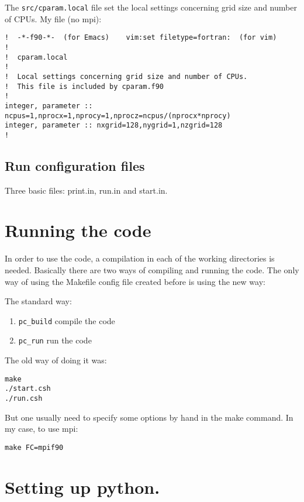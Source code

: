 \documentclass[a4paper,12pt]{article}
\begin{document}
The \texttt{src/cparam.local} file set the local settings concerning grid size
and number of CPUs. My file (no mpi):
\begin{verbatim}
!  -*-f90-*-  (for Emacs)    vim:set filetype=fortran:  (for vim)
!
!  cparam.local
!
!  Local settings concerning grid size and number of CPUs.
!  This file is included by cparam.f90
!
integer, parameter :: ncpus=1,nprocx=1,nprocy=1,nprocz=ncpus/(nprocx*nprocy)
integer, parameter :: nxgrid=128,nygrid=1,nzgrid=128
!
\end{verbatim}

\subsection{Run configuration files}
Three basic files: print.in, run.in and start.in.


\section{Running the code}

In order to use the code, a compilation in each of the working directories is
needed. Basically there are two ways of compiling and running the code.
The only way of using the Makefile config file created before is using the new
way:

The standard way:
\begin{enumerate}
  \item \verb|pc_build| compile the code
  \item \verb|pc_run| run the code
\end{enumerate}

The old way of doing it was:
\begin{verbatim}
make
./start.csh
./run.csh
\end{verbatim}
But one usually need to specify some options by hand in the make command. In my
case, to use mpi:
\begin{verbatim}
make FC=mpif90
\end{verbatim}

\section{Setting up python.}
\end{document}
